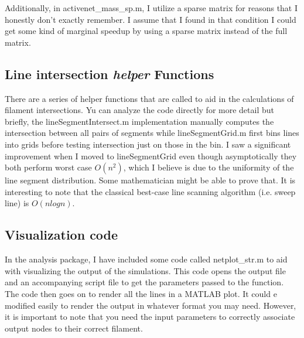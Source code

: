 Additionally, in activenet\_mass\_sp.m, I utilize a sparse matrix for reasons that I honestly don't exactly remember.  I assume that I found in that condition I could get some kind of marginal speedup by using a sparse matrix instead of the full matrix.


\subsection{Line intersection \textit{helper} Functions}
There are a series of helper functions that are called to aid in the calculations of filament intersections.  Yu can analyze the code directly for more detail but briefly, the lineSegmentIntersect.m implementation manually computes the intersection between all pairs of segments while lineSegmentGrid.m first bins lines into grids before testing intersection just on those in the bin.  I saw a significant improvement when I moved to lineSegmentGrid even though asymptotically they both perform worst case $O(n^2)$, which I believe is due to the uniformity of the line segment distribution.  Some mathematician might be able to prove that.  It is interesting to note that the classical best-case line scanning algorithm (i.e. sweep line) is $O(nlogn)$.

\subsection{Visualization code}
In the analysis package, I have included some code called netplot\_str.m to aid with visualizing the output of the simulations.  This code opens the output file and an accompanying script file to get the parameters passed to the function.  The code then goes on to render all the lines in a MATLAB plot.  It could e modified easily to render the output in whatever format you may need.  However, it is important to note that you need the input parameters to correctly associate output nodes to their correct filament.